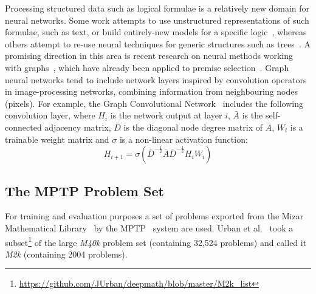 \documentclass[runningheads]{llncs}
\newcommand{\mizarlarge}{\textit{M40k}}
\newcommand{\mizarsmall}{\textit{M2k}}
\begin{document}
Processing structured data such as logical formulae is a relatively new domain for neural networks.
Some work attempts to use unstructured representations of such formulae, such as text, or build entirely-new models for a specific logic~\cite{logical-entailment}, whereas others attempt to re-use neural techniques for generic structures such as trees~\cite{logical-tree}.
A promising direction in this area is recent research on neural methods working with graphs~\cite{graph-cnn,gcn,gcn-relational}, which have already been applied to premise selection~\cite{formula-graph}.
Graph neural networks tend to include network layers inspired by convolution operators in image-processing networks, combining information from neighbouring nodes (pixels).
For example, the Graph Convolutional Network~\cite{gcn} includes the following convolution layer, where \(H_i\) is the network output at layer \(i\), \(\bar{A}\) is the self-connected adjacency matrix, \(\bar{D}\) is the diagonal node degree matrix of \(\bar{A}\), \(W_i\) is a trainable weight matrix and \(\sigma\) is a non-linear activation function:
\[
	H_{i + 1} = \sigma\left(\bar{D}^{-\frac{1}{2}}\bar{A}\bar{D}^{-\frac{1}{2}}H_iW_i\right)
\]

\subsection{The MPTP Problem Set}
For training and evaluation purposes a set of problems exported from the Mizar Mathematical Library~\cite{mizar} by the MPTP~\cite{MPTP} system are used.
Urban et al.~\cite{rlCoP} took a subset\footnote{\url{https://github.com/JUrban/deepmath/blob/master/M2k_list}} of the large \mizarlarge{} problem set (containing 32,524 problems) and called it \mizarsmall{} (containing 2004 problems).
\end{document}
